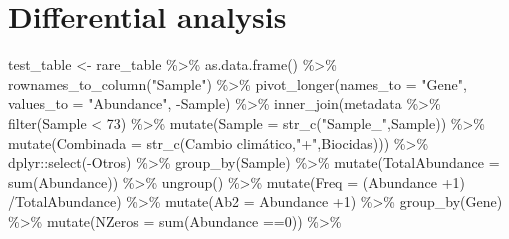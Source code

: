 \documentclass[
  letterpaper,
  DIV=11,
  numbers=noendperiod]{scrartcl}
\newenvironment{Shaded}{\begin{snugshade}}{\end{snugshade}}
\newcommand{\AttributeTok}[1]{\textcolor[rgb]{0.40,0.45,0.13}{#1}}
\newcommand{\DecValTok}[1]{\textcolor[rgb]{0.68,0.00,0.00}{#1}}
\newcommand{\FunctionTok}[1]{\textcolor[rgb]{0.28,0.35,0.67}{#1}}
\newcommand{\NormalTok}[1]{\textcolor[rgb]{0.00,0.23,0.31}{#1}}
\newcommand{\OtherTok}[1]{\textcolor[rgb]{0.00,0.23,0.31}{#1}}
\newcommand{\SpecialCharTok}[1]{\textcolor[rgb]{0.37,0.37,0.37}{#1}}
\newcommand{\StringTok}[1]{\textcolor[rgb]{0.13,0.47,0.30}{#1}}
\begin{document}
\hypertarget{differential-analysis}{%
\section{Differential analysis}\label{differential-analysis}}

\begin{Shaded}
\begin{Highlighting}[]
\NormalTok{test\_table }\OtherTok{\textless{}{-}}\NormalTok{ rare\_table }\SpecialCharTok{\%\textgreater{}\%} 
  \FunctionTok{as.data.frame}\NormalTok{() }\SpecialCharTok{\%\textgreater{}\%} 
  \FunctionTok{rownames\_to\_column}\NormalTok{(}\StringTok{"Sample"}\NormalTok{) }\SpecialCharTok{\%\textgreater{}\%} 
  \FunctionTok{pivot\_longer}\NormalTok{(}\AttributeTok{names\_to =} \StringTok{"Gene"}\NormalTok{, }\AttributeTok{values\_to =} \StringTok{"Abundance"}\NormalTok{, }\SpecialCharTok{{-}}\NormalTok{Sample) }\SpecialCharTok{\%\textgreater{}\%} 
  \FunctionTok{inner\_join}\NormalTok{(metadata }\SpecialCharTok{\%\textgreater{}\%} 
               \FunctionTok{filter}\NormalTok{(Sample }\SpecialCharTok{\textless{}} \DecValTok{73}\NormalTok{) }\SpecialCharTok{\%\textgreater{}\%} 
               \FunctionTok{mutate}\NormalTok{(}\AttributeTok{Sample =} \FunctionTok{str\_c}\NormalTok{(}\StringTok{"Sample\_"}\NormalTok{,Sample)) }\SpecialCharTok{\%\textgreater{}\%} 
               \FunctionTok{mutate}\NormalTok{(}\AttributeTok{Combinada =} \FunctionTok{str\_c}\NormalTok{(}\StringTok{\textasciigrave{}}\AttributeTok{Cambio climático}\StringTok{\textasciigrave{}}\NormalTok{,}\StringTok{"+"}\NormalTok{,Biocidas))) }\SpecialCharTok{\%\textgreater{}\%} 
\NormalTok{  dplyr}\SpecialCharTok{::}\FunctionTok{select}\NormalTok{(}\SpecialCharTok{{-}}\NormalTok{Otros) }\SpecialCharTok{\%\textgreater{}\%} 
  \FunctionTok{group\_by}\NormalTok{(Sample) }\SpecialCharTok{\%\textgreater{}\%} 
  \FunctionTok{mutate}\NormalTok{(}\AttributeTok{TotalAbundance =} \FunctionTok{sum}\NormalTok{(Abundance)) }\SpecialCharTok{\%\textgreater{}\%} 
  \FunctionTok{ungroup}\NormalTok{() }\SpecialCharTok{\%\textgreater{}\%} 
  \FunctionTok{mutate}\NormalTok{(}\AttributeTok{Freq =}\NormalTok{ (Abundance }\SpecialCharTok{+}\DecValTok{1}\NormalTok{) }\SpecialCharTok{/}\NormalTok{TotalAbundance) }\SpecialCharTok{\%\textgreater{}\%} 
  \FunctionTok{mutate}\NormalTok{(}\AttributeTok{Ab2 =}\NormalTok{ Abundance }\SpecialCharTok{+}\DecValTok{1}\NormalTok{) }\SpecialCharTok{\%\textgreater{}\%} 
  \FunctionTok{group\_by}\NormalTok{(Gene) }\SpecialCharTok{\%\textgreater{}\%} 
  \FunctionTok{mutate}\NormalTok{(}\AttributeTok{NZeros =} \FunctionTok{sum}\NormalTok{(Abundance }\SpecialCharTok{==}\DecValTok{0}\NormalTok{)) }\SpecialCharTok{\%\textgreater{}\%} 

\end{Highlighting}
\end{Shaded}
\end{document}
